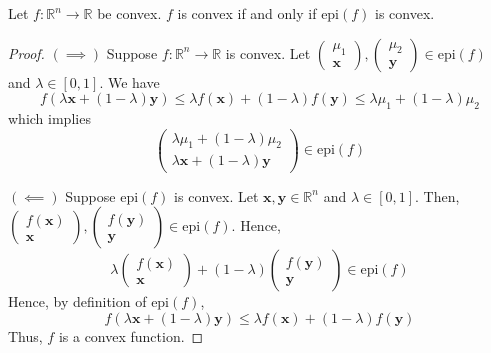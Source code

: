 \begin{thmbox}
    \begin{theorem}
        Let $ f:\mathbb{R}^n\to\mathbb{R} $ be convex.
        $ f $ is convex if and only if $ \text{epi}(f) $ is convex.
    \end{theorem}
\end{thmbox}

\begin{proof}
    $ (\implies) $ Suppose $ f:\mathbb{R}^n\to\mathbb{R} $ is convex.
    Let $ \begin{pmatrix}
            \mu_1 \\
            \bm{x}
        \end{pmatrix},
        \begin{pmatrix}
            \mu_2 \\
            \bm{y}
        \end{pmatrix}\in\text{epi}(f) $ and $ \lambda\in[0,1] $. We have
    \[ f(\lambda \bm{x} + (1-\lambda)\bm{y})\leqslant \lambda f(\bm{x})+(1-\lambda)f(\bm{y})
        \leqslant \lambda\mu_1+(1-\lambda)\mu_2 \]
    which implies
    \[ \begin{pmatrix}
            \lambda\mu_1+(1-\lambda)\mu_2 \\
            \lambda\bm{x}+(1-\lambda)\bm{y}
        \end{pmatrix}\in\text{epi}(f) \]

    $ (\impliedby) $ Suppose $ \text{epi}(f) $ is convex. Let $ \bm{x},\bm{y}\in\mathbb{R}^n $
    and $ \lambda\in[0,1] $. Then,
    $
        \begin{pmatrix}
            f(\bm{x}) \\
            \bm{x}
        \end{pmatrix},
        \begin{pmatrix}
            f(\bm{y}) \\
            \bm{y}
        \end{pmatrix}
        \in\text{epi}(f) $.
    Hence,
    \[ \lambda
        \begin{pmatrix}
            f(\bm{x}) \\
            \bm{x}
        \end{pmatrix}+
        (1-\lambda)
        \begin{pmatrix}
            f(\bm{y}) \\
            \bm{y}
        \end{pmatrix}\in\text{epi}(f) \]
    Hence, by definition of $ \text{epi}(f) $,
    \[ f(\lambda \bm{x} + (1-\lambda)\bm{y})\leqslant \lambda f(\bm{x})+(1-\lambda)f(\bm{y}) \]
    Thus, $ f $ is a convex function.
\end{proof}

